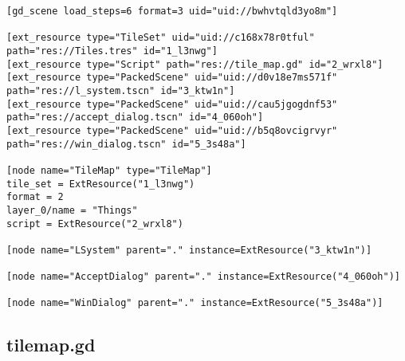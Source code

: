 \begin{lstlisting}
[gd_scene load_steps=6 format=3 uid="uid://bwhvtqld3yo8m"]

[ext_resource type="TileSet" uid="uid://c168x78r0tful" path="res://Tiles.tres" id="1_l3nwg"]
[ext_resource type="Script" path="res://tile_map.gd" id="2_wrxl8"]
[ext_resource type="PackedScene" uid="uid://d0v18e7ms571f" path="res://l_system.tscn" id="3_ktw1n"]
[ext_resource type="PackedScene" uid="uid://cau5jgogdnf53" path="res://accept_dialog.tscn" id="4_060oh"]
[ext_resource type="PackedScene" uid="uid://b5q8ovcigrvyr" path="res://win_dialog.tscn" id="5_3s48a"]

[node name="TileMap" type="TileMap"]
tile_set = ExtResource("1_l3nwg")
format = 2
layer_0/name = "Things"
script = ExtResource("2_wrxl8")

[node name="LSystem" parent="." instance=ExtResource("3_ktw1n")]

[node name="AcceptDialog" parent="." instance=ExtResource("4_060oh")]

[node name="WinDialog" parent="." instance=ExtResource("5_3s48a")]
\end{lstlisting}

\subsection{tile\textunderscore{}map.gd}

